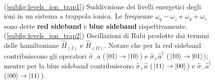 \begin{figure}[H]
	\centering	
	 \\
	\caption{(\ref{subfig:levels_ion_trap1}) Suddivisione dei livelli energetici degli ioni in un sistema a trappola ionica. Le frequenze $\omega_q - \omega_z$ e $\omega_q + \omega_z$ sono dette \textbf{red sideband} e \textbf{blue sideband} rispettivamente.  (\ref{subfig:levels_ion_trap2}) Oscillazioni di Rabi prodotte dai termini delle hamiltoniane $\hat{H}_{(I)}$ e $\hat{H}_{(II)}$. Notare che per la red sideband contribuiscono gli operatori $\hat{\sigma}_- \hat{a}$ ($\ket{01} \to \ket{10}$) e $\hat{\sigma}_+ \hat{a}^\dag$ ($\ket{10} \to \ket{01}$); mentre per la blue sideband contribuiscono $\hat{\sigma}_+ \hat{a}$ ($\ket{11} \to \ket{00}$) e $\hat{\sigma}_- \hat{a}^\dag$ ($\ket{00} \to \ket{11}$).}
    \label{fig:levels_ion_trap}
\end{figure}

